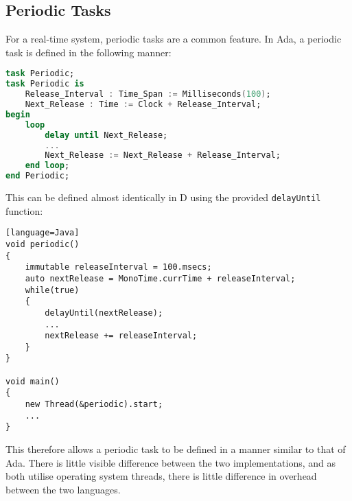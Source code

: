 \subsection{Periodic Tasks}
For a real-time system, periodic tasks are a common feature. In Ada, a periodic
task is defined in the following manner: 
\begin{lstlisting}[basicstyle=\small,language=Ada]
task Periodic; 
task Periodic is 
    Release_Interval : Time_Span := Milliseconds(100); 
    Next_Release : Time := Clock + Release_Interval; 
begin
    loop 
        delay until Next_Release; 
        ... 
        Next_Release := Next_Release + Release_Interval; 
    end loop; 
end Periodic; 
\end{lstlisting}
This can be defined almost identically in D using the provided \texttt{delayUntil} function: 
\begin{lstlisting}[basicstyle=\small][language=Java]
void periodic()
{
    immutable releaseInterval = 100.msecs; 
    auto nextRelease = MonoTime.currTime + releaseInterval; 
    while(true)
    {
        delayUntil(nextRelease); 
        ...
        nextRelease += releaseInterval; 
    }
}

void main()
{
    new Thread(&periodic).start; 
    ...
}
\end{lstlisting}
This therefore allows a periodic task to be defined in a manner 
similar to that of Ada. There is little visible difference between the two
implementations, and as both utilise operating system threads, there is little
difference in overhead between the two languages. 

